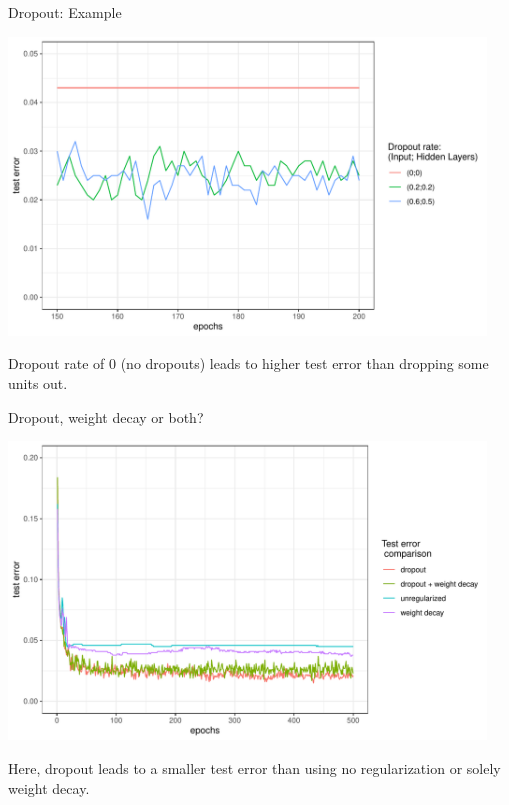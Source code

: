 \begin{vbframe}{Dropout: Example}
\begin{knitrout}
{\centering \includegraphics[width=0.95\textwidth]{figure/unnamed-chunk-4-1} 

}


\end{knitrout}
Dropout rate of 0 (no dropouts) leads to higher test error than dropping some units out. 
\end{vbframe}
\begin{vbframe}{Dropout, weight decay or both?}

\begin{knitrout}\scriptsize
{}\color{fgcolor}

{\centering \includegraphics[width=0.95\textwidth]{figure/unnamed-chunk-5-1} 

}


\end{knitrout}
Here, dropout leads to a smaller test error than using no regularization or solely weight decay. 
\end{vbframe}

